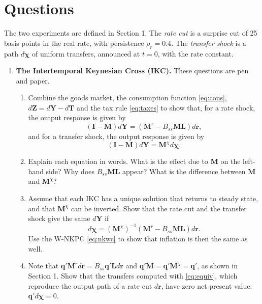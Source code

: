 \section*{Questions}

The two experiments are defined in Section 1. The \emph{rate cut} is a surprise cut of 25 basis points in the real rate, with persistence $\rho_r=0.4$. The \emph{transfer shock} is a path $d\boldsymbol{\chi}$ of uniform transfers, announced at $t=0$, with the rate constant.

\begin{enumerate}
\item \textbf{The Intertemporal Keynesian Cross (IKC).} These questions are pen and paper.
\begin{enumerate}
\item Combine the goods market, the consumption function \eqref{eq:cons}, $d\boldsymbol{Z}=d\boldsymbol{Y}-d\boldsymbol{T}$ and the tax rule \eqref{eq:taxes} to show that, for a rate shock, the output response is given by
\begin{equation}
(\boldsymbol{I}-\boldsymbol{M})d\boldsymbol{Y}=\left(\boldsymbol{M}^{r}-B_{ss}\boldsymbol{M}\boldsymbol{L}\right)d\boldsymbol{r},\label{eq:ikc_monetary}
\end{equation}
and for a transfer shock, the output response is given by
\begin{equation}
(\boldsymbol{I}-\boldsymbol{M})d\boldsymbol{Y}=\boldsymbol{M}^{\chi}d\boldsymbol{\chi}.\label{eq:ikc_transfer}
\end{equation}
\item Explain each equation in words. What is the effect due to $\boldsymbol{M}$ on the left-hand side? Why does $B_{ss}\boldsymbol{M}\boldsymbol{L}$ appear? What is the difference between $\boldsymbol{M}$ and $\boldsymbol{M}^{\chi}$?
\item Assume that each IKC has a unique solution that returns to steady state, and that $\boldsymbol{M}^{\chi}$ can be inverted. Show that the rate cut and the transfer shock give the same $d\boldsymbol{Y}$ if
\begin{equation}
d\boldsymbol{\chi}=(\boldsymbol{M}^{\chi})^{-1}\left(\boldsymbol{M}^{r}-B_{ss}\boldsymbol{M}\boldsymbol{L}\right)d\boldsymbol{r}.\label{eq:equiv}
\end{equation}
Use the W-NKPC \eqref{eq:nkwc} to show that inflation is then the same as well.
\item Note that $\boldsymbol{q}'\boldsymbol{M}^{r}d\boldsymbol{r}=B_{ss}\boldsymbol{q}'\boldsymbol{L}d\boldsymbol{r}$ and $\boldsymbol{q}'\boldsymbol{M}=\boldsymbol{q}'\boldsymbol{M}^{\chi}=\boldsymbol{q}'$, as shown in Section 1. Show that the transfers computed with \eqref{eq:equiv}, which reproduce the output path of a rate cut $d\boldsymbol{r}$, have zero net present value: $\boldsymbol{q}'d\boldsymbol{\chi}=0$.
\end{enumerate}


\end{enumerate}
